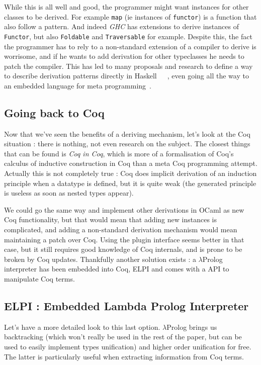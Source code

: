 \documentclass{article}
\newcommand{\lprog}{$\lambda$Prolog }
\begin{document}
While this is all well and good, the programmer might want instances for other
classes to be derived. For example \texttt{map} (ie instances of \texttt{functor})
is a function that also follow a pattern. And indeed \emph{GHC} has extensions
to derive instances of \texttt{Functor}, but also \texttt{Foldable} and
\texttt{Traversable} for example. Despite this, the fact the programmer has to
rely to a non-standard extension of a compiler to derive is worrisome, and if he
wants to add derivation for other typeclasses he needs to patch the compiler.
This has led to many proposals and research to define a way to describe derivation
patterns directly in Haskell~\cite{genDerHaskell10}~\cite{reflDer97}~\cite{genDep},
even going all the way to an embedded language for meta programming~\cite{templateHaskell}.

\subsection{Going back to Coq}

Now that we've seen the benefits of a deriving mechanism, let's look at the Coq
situation : there is nothing, not even research on the subject. The closest
things that can be found is \emph{Coq in Coq}\cite{coqincoq}, which is more of
a formalisation of Coq's calculus of inductive construction in Coq than a
meta Coq programming attempt. Actually this is not completely true : Coq does
implicit derivation of an induction principle when a datatype is defined, but
it is quite weak (the generated principle is useless as soon as nested types
appear).

We could go the same way and implement other derivations in OCaml as new Coq
functionality, but that would mean that adding new instances is complicated,
and adding a non-standard derivation mechanism would mean maintaining a patch
over Coq. Using the plugin interface seems better in that case, but it still
requires good knowledge of Coq internals, and is prone to be broken by Coq
updates. Thankfully another solution exists : a \lprog\cite{HiOrProg}
interpreter has been embedded into Coq, ELPI\cite{ELPI} and comes with a API to
manipulate Coq terms.

\subsection{ELPI : Embedded Lambda Prolog Interpreter}

Let's have a more detailed look to this last option. \lprog brings us
backtracking (which won't really be used in the rest of the paper, but can be
used to easily implement types unification\cite{ELPItype}) and higher order unification
for free. The latter is particularly useful when extracting information from
Coq terms.
\end{document}
